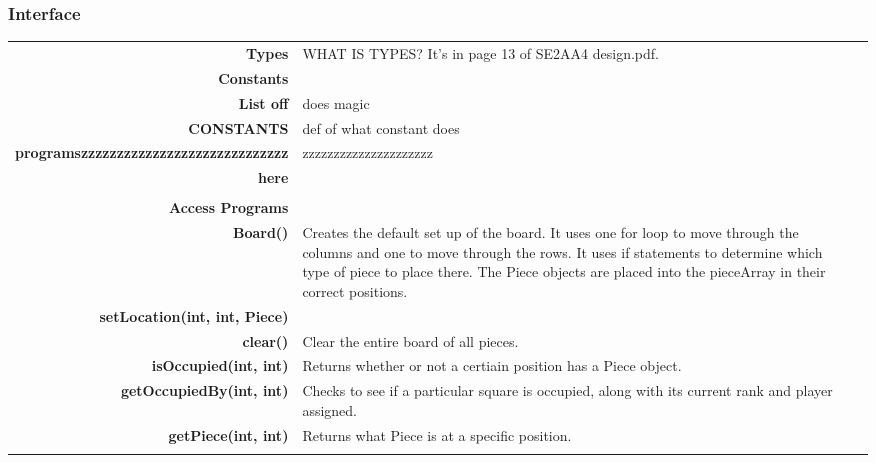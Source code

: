 \documentclass[10pt]{article}
\begin{document}
    \subsubsection{Interface}
        \begin{tabularx}{\linewidth}{@{} >{\bfseries}r Xp{5cm} }
            Types           & WHAT IS TYPES? It's in page 13 of SE2AA4 design.pdf. \\
            
            Constants       & \begin{tabular}[t]{@{} l p{8cm}} 
                                     & \\
                                    List off & does magic \\
                                    CONSTANTS & def of what constant does \\
                                    programszzzzzzzzzzzzzzzzzzzzzzzzzzzzz & zzzzzzzzzzzzzzzzzzzzz \\
                                    here & \\ 
                              \end{tabular} \\

            Access Programs & \begin{tabular}[t]{@{} l p{8cm}}
                                     & \\
                                    Board() & Creates the default set up of the board. It uses one for loop to move through the columns and one to move through the rows. It uses if statements to determine which type of piece to place there. The Piece objects are placed into the pieceArray in their correct positions.\\
                                    setLocation(int, int, Piece) &  \\
                                    clear() & Clear the entire board of all pieces. \\
                                    isOccupied(int, int) & Returns whether or not a certiain position has a Piece object. \\ 
                                    getOccupiedBy(int, int) & Checks to see if a particular square is occupied, along with its current rank and player assigned. \\
                                    getPiece(int, int) & Returns what Piece is at a specific position. \\
                              \end{tabular}
        \end{tabularx}
        
\end{document}

